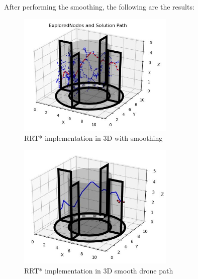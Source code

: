 \documentclass{IEEEtran}
\begin{document}
After performing the smoothing, the following are the results:
\begin{figure}[h]
    \centering
    \includegraphics[width=7.5cm]{rrt3dstarsmooth}
    \caption{RRT* implementation in 3D with smoothing}
    \label{fig:RRT* implementation in 3D with smoothing}
\end{figure}
\begin{figure}[h]
    \centering
    \includegraphics[width=7.5cm]{rrtstar3dsmoothdrone}
    \caption{RRT* implementation in 3D smooth drone path}
    \label{fig:RRT* implementation in 3D smooth drone path}
\end{figure}
\end{document}
